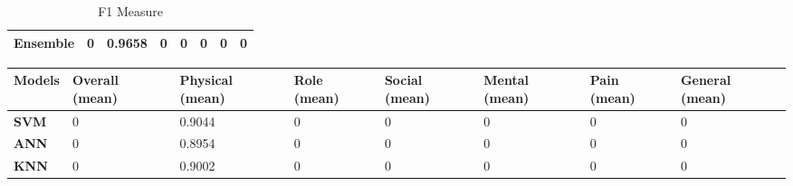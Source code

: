 \documentclass[runningheads]{llncs}
\begin{document}
\begin{table}[h]
\begin{tabular}{|C{2cm}|C{1.5cm}|C{1.5cm}|C{1.5cm}|C{1.5cm}|C{1.5cm}|C{1.5cm}|C{1.5cm}|}
\textbf{Ensemble}                      & 0                                       & 0.9658                                        & 0                                                          & 0                                                            & 0                                                            & 0                                                          & 0                                      \\ \hline
\end{tabular}
\caption{F1 Measure}
\label{F1}
\end{table}
%
%
\begin{table}[h]
\begin{tabular}{|C{2cm}|C{1.5cm}|C{1.5cm}|C{1.5cm}|C{1.5cm}|C{1.5cm}|C{1.5cm}|C{1.5cm}|}
\hline
{} 
{\color[HTML]{333333} \textbf{Models}} & {\color[HTML]{333333} \textbf{Overall (mean)}} & {\color[HTML]{333333} \textbf{Physical (mean)}} & {\color[HTML]{333333} \textbf{Role (mean)}} &{\color[HTML]{333333} \textbf{Social (mean)}} & {\color[HTML]{333333} \textbf{Mental (mean)}} & {\color[HTML]{333333} \textbf{Pain (mean)}} & {\color[HTML]{333333} \textbf{General (mean)}} \\ \hline
{} 
\textbf{SVM}                           & 0                                       & 0.9044                                        & 0                                                          & 0                                                            & 0                                                            & 0                                                          & 0                                      \\ \hline
{} 
\textbf{ANN}                           & 0                                       & 0.8954                                        & 0                                                          & 0                                                            & 0                                                            & 0                                                          & 0                                      \\ \hline
{} 
\textbf{KNN}                           & 0                                       & 0.9002                                        & 0                                                          & 0                                                            & 0                                                            & 0                                                          & 0                                      \\ \hline

\end{tabular}
\end{table}
\end{document}
